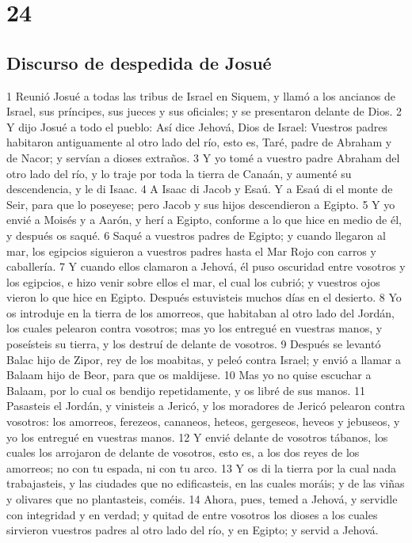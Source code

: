 \chapter{24}

\section*{Discurso de despedida de Josué}


1 Reunió Josué a todas las tribus de Israel en Siquem, y llamó a los ancianos de Israel, sus príncipes, sus jueces y sus oficiales; y se presentaron delante de Dios.
2 Y dijo Josué a todo el pueblo: Así dice Jehová, Dios de Israel: Vuestros padres habitaron antiguamente al otro lado del río, esto es, Taré, padre de Abraham y de Nacor; y servían a dioses extraños.
3 Y yo tomé a vuestro padre Abraham del otro lado del río, y lo traje por toda la tierra de Canaán, y aumenté su descendencia, y le di Isaac. 
4 A Isaac di Jacob y Esaú. Y a Esaú di el monte de Seir, para que lo poseyese; pero Jacob y sus hijos descendieron a Egipto. 
5 Y yo envié a Moisés y a Aarón, y herí a Egipto, conforme a lo que hice en medio de él, y después os saqué.
6 Saqué a vuestros padres de Egipto; y cuando llegaron al mar, los egipcios siguieron a vuestros padres hasta el Mar Rojo con carros y caballería.
7 Y cuando ellos clamaron a Jehová, él puso oscuridad entre vosotros y los egipcios, e hizo venir sobre ellos el mar, el cual los cubrió; y vuestros ojos vieron lo que hice en Egipto. Después estuvisteis muchos días en el desierto.
8 Yo os introduje en la tierra de los amorreos, que habitaban al otro lado del Jordán, los cuales pelearon contra vosotros; mas yo los entregué en vuestras manos, y poseísteis su tierra, y los destruí de delante de vosotros. 
9 Después se levantó Balac hijo de Zipor, rey de los moabitas, y peleó contra Israel; y envió a llamar a Balaam hijo de Beor, para que os maldijese.
10 Mas yo no quise escuchar a Balaam, por lo cual os bendijo repetidamente, y os libré de sus manos.
11 Pasasteis el Jordán, y vinisteis a Jericó, y los moradores de Jericó pelearon contra vosotros: los amorreos, ferezeos, cananeos, heteos, gergeseos, heveos y jebuseos, y yo los entregué en vuestras manos.
12 Y envié delante de vosotros tábanos, los cuales los arrojaron de delante de vosotros, esto es, a los dos reyes de los amorreos; no con tu espada, ni con tu arco.
13 Y os di la tierra por la cual nada trabajasteis, y las ciudades que no edificasteis, en las cuales moráis; y de las viñas y olivares que no plantasteis, coméis. 
14 Ahora, pues, temed a Jehová, y servidle con integridad y en verdad; y quitad de entre vosotros los dioses a los cuales sirvieron vuestros padres al otro lado del río, y en Egipto; y servid a Jehová.
